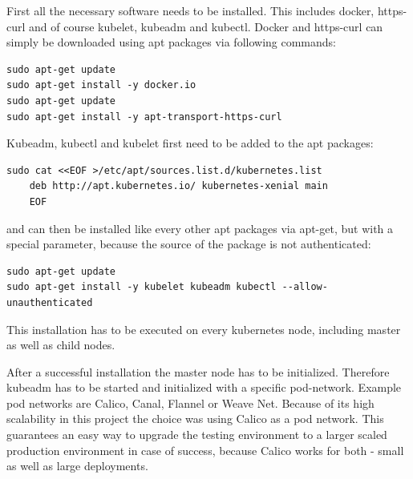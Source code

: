 First all the necessary software needs to be installed. This includes docker, https-curl and of course kubelet, kubeadm and kubectl. Docker and https-curl can simply be downloaded using apt packages via following commands:
\begin{lstlisting}[caption={Kubernetes requirements installation},captionpos=b]
sudo apt-get update
sudo apt-get install -y docker.io
sudo apt-get update
sudo apt-get install -y apt-transport-https-curl
\end{lstlisting}
Kubeadm, kubectl and kubelet first need to be added to the apt packages:
\begin{lstlisting}[caption={Add Kubernetes package to apt},captionpos=b]
sudo cat <<EOF >/etc/apt/sources.list.d/kubernetes.list
	deb http://apt.kubernetes.io/ kubernetes-xenial main
	EOF
\end{lstlisting}
and can then be installed like every other apt packages via apt-get, but with a special parameter, because the source of the package is not authenticated:
\begin{lstlisting}[caption={Install Kubernetes},captionpos=b]
sudo apt-get update
sudo apt-get install -y kubelet kubeadm kubectl --allow-unauthenticated
\end{lstlisting}
This installation has to be executed on every kubernetes node, including master as well as child nodes.

After a successful installation the master node has to be initialized. Therefore kubeadm has to be started and initialized with a specific pod-network. Example pod networks are Calico, Canal, Flannel or Weave Net. Because of its high scalability in this project the choice was using Calico as a pod network. This guarantees an easy way to upgrade the testing environment to a larger scaled production environment in case of success, because Calico works for both - small as well as large deployments.


